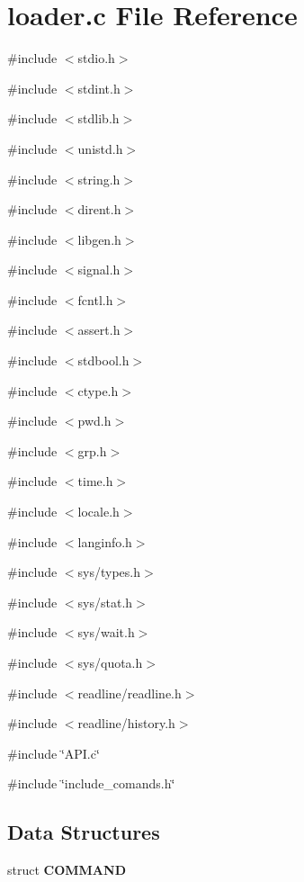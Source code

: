 \section{loader.c File Reference}
\label{loader_8c}
{\ttfamily \#include $<$stdio.h$>$}\par
{\ttfamily \#include $<$stdint.h$>$}\par
{\ttfamily \#include $<$stdlib.h$>$}\par
{\ttfamily \#include $<$unistd.h$>$}\par
{\ttfamily \#include $<$string.h$>$}\par
{\ttfamily \#include $<$dirent.h$>$}\par
{\ttfamily \#include $<$libgen.h$>$}\par
{\ttfamily \#include $<$signal.h$>$}\par
{\ttfamily \#include $<$fcntl.h$>$}\par
{\ttfamily \#include $<$assert.h$>$}\par
{\ttfamily \#include $<$stdbool.h$>$}\par
{\ttfamily \#include $<$ctype.h$>$}\par
{\ttfamily \#include $<$pwd.h$>$}\par
{\ttfamily \#include $<$grp.h$>$}\par
{\ttfamily \#include $<$time.h$>$}\par
{\ttfamily \#include $<$locale.h$>$}\par
{\ttfamily \#include $<$langinfo.h$>$}\par
{\ttfamily \#include $<$sys/types.h$>$}\par
{\ttfamily \#include $<$sys/stat.h$>$}\par
{\ttfamily \#include $<$sys/wait.h$>$}\par
{\ttfamily \#include $<$sys/quota.h$>$}\par
{\ttfamily \#include $<$readline/readline.h$>$}\par
{\ttfamily \#include $<$readline/history.h$>$}\par
{\ttfamily \#include \char`\"{}API.c\char`\"{}}\par
{\ttfamily \#include \char`\"{}include\_\-comands.h\char`\"{}}\par
\subsection*{Data Structures}
\begin{DoxyCompactItemize}
\item 
struct {\bf COMMAND}
\end{DoxyCompactItemize}
